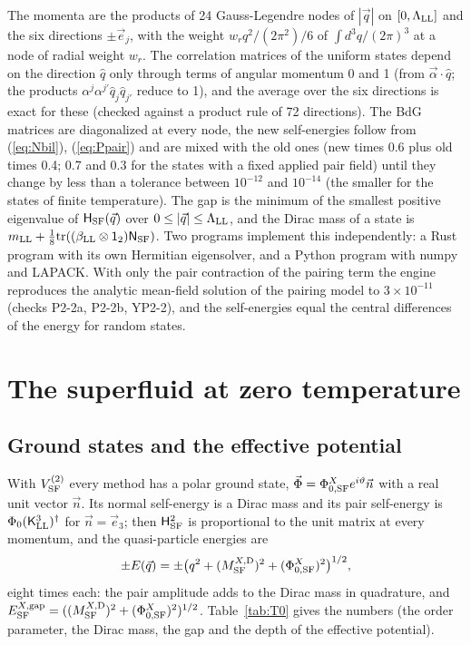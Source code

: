 \documentclass[aps,prd,onecolumn,superscriptaddress,nofootinbib,floatfix,longbibliography]{revtex4-2}
\newcommand{\LL}{{\rm LL}}
\newcommand{\SF}{{\rm SF}}
\newcommand{\tr}{\mathrm{tr}}
\begin{document}
The momenta are the products of 24 Gauss-Legendre nodes of $|\vec q|$ on $[0,\Lambda_\LL]$ and the six directions $\pm\vec e_j$,
with the weight $w_rq^2/(2\pi^2)/6$ of $\int d^3q/(2\pi)^3$ at a node of radial weight $w_r$. The correlation matrices of the
uniform states depend on the direction $\hat q$ only through terms of angular momentum 0 and 1 (from $\vec\alpha\cdot\hat q$; the
products $\alpha^j\alpha^{j'}\hat q_j\hat q_{j'}$ reduce to 1), and the average over the six directions is exact for these (checked
against a product rule of 72 directions). The BdG matrices are diagonalized at every node, the new self-energies follow
from (\ref{eq:Nbil}), (\ref{eq:Ppair}) and are mixed with the old ones (new times 0.6 plus old times 0.4; 0.7 and 0.3 for the states with a fixed applied pair field) until they change by
less than a tolerance between $10^{-12}$ and $10^{-14}$ (the smaller for the states of finite temperature). The gap is the minimum of the smallest positive eigenvalue of $\mathsf H_\SF(\vec q)$ over
$0\le|\vec q|\le\Lambda_\LL$, and the Dirac mass of a state is $m_\LL+\frac18\tr((\beta_\LL\otimes\mathsf 1_2)\mathsf N_\SF)$. Two programs
implement this independently: a Rust program with its own Hermitian eigensolver, and a Python program with numpy and LAPACK.
With only the pair contraction of the pairing term the engine reproduces the analytic mean-field solution of the pairing
model to $3\times10^{-11}$ (checks P2-2a, P2-2b, YP2-2), and the self-energies equal the central differences of the energy for random states.

\section{The superfluid at zero temperature}
\label{sec:T0}

\subsection{Ground states and the effective potential}

With $V^{(2)}_\SF$ every method has a polar ground state, $\vec\Phi=\Phi^X_{0,\SF}e^{i\vartheta}\vec n$ with a real unit vector $\vec n$.
Its normal self-energy is a Dirac mass and its pair self-energy is $\Phi_0(\mathsf K^3_\LL)^\dagger$ for $\vec n=\vec e_3$; then
$\mathsf H_\SF^2$ is proportional to the unit matrix at every momentum, and the quasi-particle energies are
\begin{equation}
\pm E(\vec q)=\pm\big(q^2+(M^{X,{\rm D}}_\SF)^2+(\Phi^X_{0,\SF})^2\big)^{1/2},
\label{eq:qp}
\end{equation}
eight times each: the pair amplitude adds to the Dirac mass in quadrature, and $E^{X,{\rm gap}}_\SF=((M^{X,{\rm D}}_\SF)^2+(\Phi^X_{0,\SF})^2)^{1/2}$.
Table~\ref{tab:T0} gives the numbers (the order parameter, the Dirac mass, the gap and the depth of the effective potential).
\end{document}
